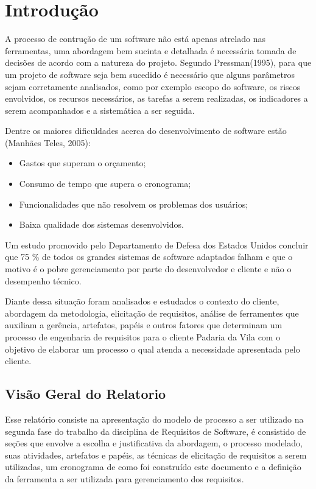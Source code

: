 \chapter{Introdução}

	A processo de contrução de um software não está apenas atrelado nas ferramentas, uma abordagem bem sucinta e detalhada é necessária tomada de decisões de acordo com a natureza do projeto. Segundo Pressman(1995), para que um projeto de software seja bem sucedido é necessário que alguns parâmetros sejam corretamente analisados, como por exemplo escopo do software, os riscos envolvidos, os recursos necessários, as tarefas a serem realizadas, os indicadores a serem acompanhados e a sistemática a ser seguida.

	Dentre os maiores dificuldades acerca do desenvolvimento de software estão (Manhães Teles, 2005):

\begin{itemize}	
	\item Gastos que superam o orçamento;
	\item Consumo de tempo que supera o cronograma;
	\item Funcionalidades que não resolvem os problemas dos usuários;
	\item Baixa qualidade dos sistemas desenvolvidos.
\end{itemize}

	Um estudo promovido pelo Departamento de Defesa dos Estados Unidos concluir que 75 \% de todos os grandes sistemas de software adaptados falham e que o motivo é o pobre gerenciamento por parte do desenvolvedor e cliente e não o desempenho técnico.

	Diante dessa situação foram analisados e estudados o contexto do cliente, abordagem da metodologia, elicitação de requisitos, análise de ferramentes que auxiliam a gerência, artefatos, papéis e outros fatores que determinam um processo de engenharia de requisitos para o cliente Padaria da Vila com o objetivo de elaborar um processo o qual atenda a necessidade apresentada pelo cliente.

\section{Visão Geral do Relatorio}

Esse relatório consiste na apresentação do modelo de processo a ser utilizado na segunda fase do trabalho da disciplina de Requisitos de Software, é consistido de seções que envolve a escolha e justificativa da abordagem, o processo modelado, suas atividades, artefatos e papéis, as técnicas de elicitação de requisitos a serem utilizadas, um cronograma de como foi construído este documento e a definição da ferramenta a ser utilizada para gerenciamento dos requisitos.

